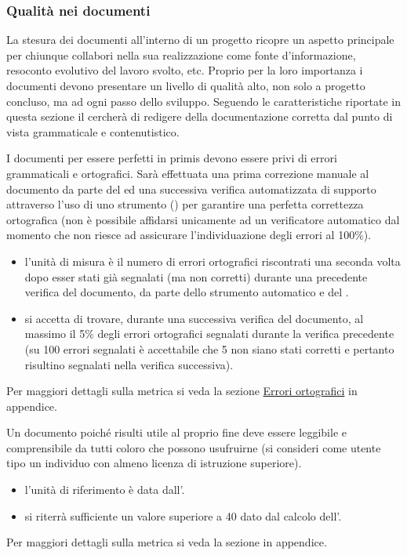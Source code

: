 \documentclass[a4paper, titlepage]{article}
\begin{document}
\subsubsection{Qualità nei documenti}
La stesura dei documenti all'interno di un progetto ricopre un aspetto principale per chiunque collabori nella sua realizzazione come fonte d'informazione, resoconto evolutivo del lavoro svolto, etc. Proprio per la loro importanza i documenti devono presentare un livello di qualità alto, non solo a progetto concluso, ma ad ogni passo dello sviluppo.
\newline Seguendo le caratteristiche riportate in questa sezione il  cercherà di redigere della documentazione corretta dal punto di vista grammaticale e contenutistico.

I documenti per essere perfetti in primis devono essere privi di errori grammaticali e ortografici. Sarà effettuata una prima correzione manuale al documento da parte del  ed una successiva verifica automatizzata di supporto attraverso l'uso di uno strumento () per garantire una perfetta correttezza ortografica (non è possibile affidarsi unicamente ad un verificatore automatico dal momento che non riesce ad assicurare l'individuazione degli errori al 100\%).  
\begin{itemize}
\item {} l'unità di misura è il numero di errori ortografici riscontrati una seconda volta dopo esser stati già segnalati (ma non corretti) durante una precedente verifica del documento, da parte dello strumento automatico e del .
\item {} si accetta di trovare, durante una successiva verifica del documento, al massimo il 5\% degli errori ortografici segnalati durante la verifica precedente (su 100 errori segnalati è accettabile che 5 non siano stati corretti e pertanto risultino segnalati nella verifica successiva).
\end{itemize}
Per maggiori dettagli sulla metrica si veda la sezione \hyperref[par:errort]{Errori ortografici} in appendice.

Un documento poiché risulti utile al proprio fine deve essere leggibile e comprensibile da tutti coloro che possono usufruirne (si consideri come utente tipo un individuo con almeno licenza di istruzione superiore).
\begin{itemize}
\item {} l'unità di riferimento è data dall'.
\item {} si riterrà sufficiente un valore superiore a 40 dato dal calcolo dell'.
\end{itemize}
Per maggiori dettagli sulla metrica si veda la sezione \hyperref[par:IG]{} in appendice.
\end{document}
